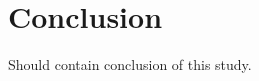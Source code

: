\documentclass{article}
\begin{document}
\section{Conclusion}
Should contain conclusion of this study.

%
%
%
%
\end{document}
